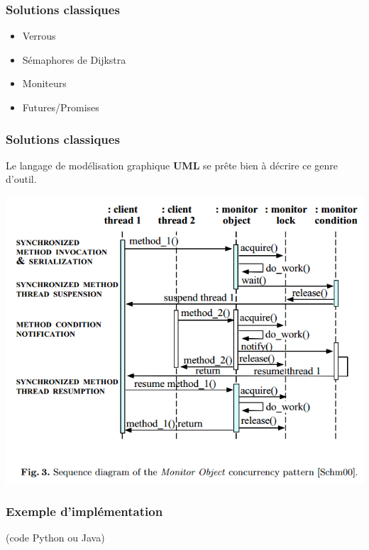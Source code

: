 \documentclass{beamer}
\begin{document}
\begin{frame}
  \frametitle{Solutions classiques}
  \begin{itemize}
  \item Verrous
  \item Sémaphores de Dijkstra
  \item Moniteurs
  \item Futures/Promises
  \end{itemize}
\end{frame}
\begin{frame}
  \frametitle{Solutions classiques}
  Le langage de modélisation graphique \textbf{UML} se prête bien à décrire ce
  genre d'outil.
  \par
  \includegraphics[width=.7\textwidth]{monitor.png}
\end{frame}
\begin{frame}
  \frametitle{Exemple d'implémentation}
  (code Python ou Java)
\end{frame}
\end{document}
